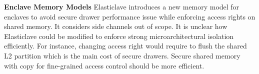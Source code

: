 \textbf{Enclave Memory Models}
Elasticlave\cite{yu2022elasticlave} introduces a new memory model for enclaves to avoid secure drawer performance issue while enforcing access rights on shared memory.
It considers side channels out of scope. It is unclear how Elasticlave could be modified to enforce strong microarchitectural isolation efficiently. For instance, changing access right would require to flush the shared L2 partition which is the  main cost of secure drawers. Secure shared memory with copy for fine-grained access control should be more efficient.